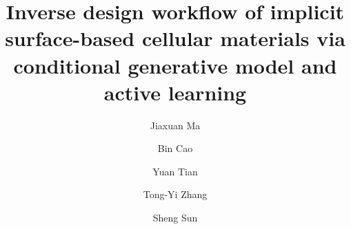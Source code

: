 \documentclass[preprint,review,12pt,authoryear]{elsarticle}
\begin{document}


\begin{frontmatter}



\title{Inverse design workflow of implicit surface-based cellular materials via conditional generative model and active learning}


\author[1]{Jiaxuan Ma}
\author[3]{Bin Cao}
\author[1]{Yuan Tian}
\author[3]{Tong-Yi Zhang}
\author[1,2]{Sheng Sun}


\address[1]{Materials Genome Institute, Shanghai University, Shanghai, 200444, China}
\address[2]{Shanghai Frontier Science Center of Mechanoinformatics, Shanghai University, Shanghai, 200444, China}
\address[3]{Advanced Materials Thrust, Hong Kong University of Science and Technology (Guangzhou), Guangzhou, 511400, Guangdong, China}



\end{frontmatter}
\end{document}
